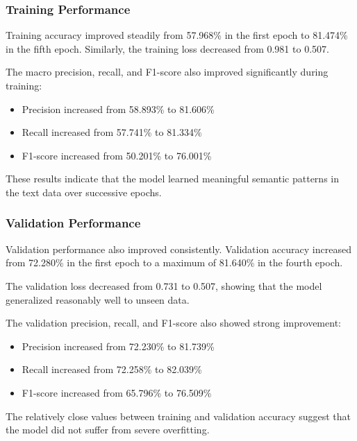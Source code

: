 \documentclass{ieeeaccess}
\begin{document}
\subsubsection{Training Performance}

Training accuracy improved steadily from 57.968\% in the first epoch to 81.474\% in the fifth epoch. Similarly, the training loss decreased from 0.981 to 0.507.

The macro precision, recall, and F1-score also improved significantly during training:

\begin{itemize}
    \item Precision increased from 58.893\% to 81.606\%
    \item Recall increased from 57.741\% to 81.334\%
    \item F1-score increased from 50.201\% to 76.001\%
\end{itemize}

These results indicate that the model learned meaningful semantic patterns in the text data over successive epochs.

\subsubsection{Validation Performance}

Validation performance also improved consistently. Validation accuracy increased from 72.280\% in the first epoch to a maximum of 81.640\% in the fourth epoch.

The validation loss decreased from 0.731 to 0.507, showing that the model generalized reasonably well to unseen data.

The validation precision, recall, and F1-score also showed strong improvement:

\begin{itemize}
    \item Precision increased from 72.230\% to 81.739\%
    \item Recall increased from 72.258\% to 82.039\%
    \item F1-score increased from 65.796\% to 76.509\%
\end{itemize}

The relatively close values between training and validation accuracy suggest that the model did not suffer from severe overfitting.
\end{document}
